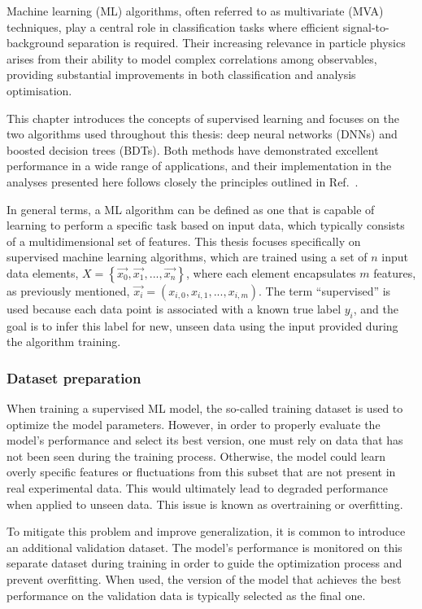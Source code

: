 



Machine learning (ML) algorithms, often referred to as multivariate (MVA) techniques, play a central role in classification tasks where efficient signal-to-background separation is required. Their increasing relevance in particle physics arises from their ability to model complex correlations among observables, providing substantial improvements in both classification and analysis optimisation. 

This chapter introduces the concepts of supervised learning and focuses on the two algorithms used throughout this thesis: deep neural networks (DNNs) and boosted decision trees (BDTs). Both methods have demonstrated excellent performance in a wide range of applications, and their implementation in the analyses presented here follows closely the principles outlined in Ref.~\cite{Goodfellow-et-al-2016}.

In general terms, a ML algorithm can be defined as one that is capable of learning to perform a specific task based on input data, which typically consists of a multidimensional set of features. This thesis focuses specifically on supervised machine learning algorithms, which are trained using a set of $n$ input data elements, $X = \left\{\vec{x_{0}}, \vec{x_{1}}, ..., \vec{x_{n}} \right\}$, where each element encapsulates $m$ features, as previously mentioned, $\vec{x_{i}}=(x_{i,0}, x_{i,1}, ..., x_{i,m})$. The term ``supervised'' is used because each data point is associated with a known true label $y_{i}$, and the goal is to infer this label for new, unseen data using the input provided during the algorithm training.

\subsubsection*{Dataset preparation}
When training a supervised ML model, the so-called training dataset is used to optimize the model parameters. However, in order to properly evaluate the model's performance and select its best version, one must rely on data that has not been seen during the training process. Otherwise, the model could learn overly specific features or fluctuations from this subset that are not present in real experimental data. This would ultimately lead to degraded performance when applied to unseen data. This issue is known as overtraining or overfitting.

To mitigate this problem and improve generalization, it is common to introduce an additional validation dataset. The model's performance is monitored on this separate dataset during training in order to guide the optimization process and prevent overfitting. When used, the version of the model that achieves the best performance on the validation data is typically selected as the final one.

